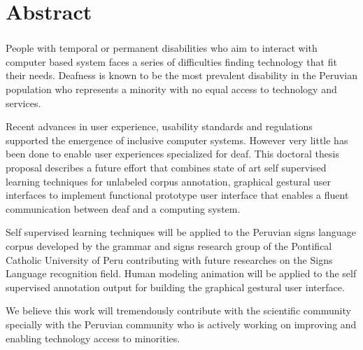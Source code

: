 \chapter*{Abstract} 
\subsection*{\thesistitle}

People with temporal or permanent disabilities who aim to interact with computer based system faces a series of difficulties finding technology that fit their needs. Deafness is known to be the most prevalent disability in the Peruvian population who represents a minority with no equal access to technology and services. 

Recent advances in user experience, usability standards and regulations supported the emergence of inclusive computer systems. However very little has been done to enable user experiences specialized for deaf. This doctoral thesis proposal describes a future effort that combines state of art self supervised learning techniques for unlabeled corpus annotation,  graphical gestural user interfaces to implement functional prototype user interface that enables a fluent communication between deaf and a computing system.

Self supervised learning techniques will be applied to the Peruvian signs language corpus developed by the grammar and signs research group of the Pontifical Catholic University of Peru contributing with future researches on the Signs Language recognition field. Human modeling animation will be applied to the self supervised annotation output for building the graphical gestural user interface.

We believe this work will tremendously contribute with the scientific community specially with the Peruvian community who is actively working on improving and enabling technology access to minorities.